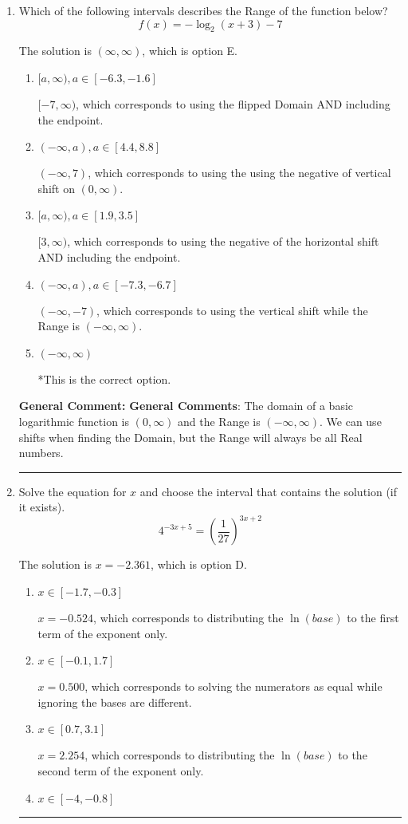 \documentclass{extbook}[14pt]
\newcommand{\litem}[1]{\item #1

\rule{\textwidth}{0.4pt}}
\begin{document}
\begin{enumerate}\litem{
Which of the following intervals describes the Range of the function below?
\[ f(x) = -\log_2{(x+3)}-7 \]

The solution is \( (\infty, \infty) \), which is option E.\begin{enumerate}[label=\Alph*.]
\item \( [a, \infty), a \in [-6.3, -1.6] \)

$[-7, \infty)$, which corresponds to using the flipped Domain AND including the endpoint.
\item \( (-\infty, a), a \in [4.4, 8.8] \)

$(-\infty, 7)$, which corresponds to using the using the negative of vertical shift on $(0, \infty)$.
\item \( [a, \infty), a \in [1.9, 3.5] \)

$[3, \infty)$, which corresponds to using the negative of the horizontal shift AND including the endpoint.
\item \( (-\infty, a), a \in [-7.3, -6.7] \)

$(-\infty, -7)$, which corresponds to using the vertical shift while the Range is $(-\infty, \infty)$.
\item \( (-\infty, \infty) \)

*This is the correct option.
\end{enumerate}

\textbf{General Comment:} \textbf{General Comments}: The domain of a basic logarithmic function is $(0, \infty)$ and the Range is $(-\infty, \infty)$. We can use shifts when finding the Domain, but the Range will always be all Real numbers.
}
\litem{
Solve the equation for $x$ and choose the interval that contains the solution (if it exists).
\[ 4^{-3x+5} = \left(\frac{1}{27}\right)^{3x+2} \]

The solution is \( x = -2.361 \), which is option D.\begin{enumerate}[label=\Alph*.]
\item \( x \in [-1.7, -0.3] \)

$x = -0.524$, which corresponds to distributing the $\ln(base)$ to the first term of the exponent only.
\item \( x \in [-0.1, 1.7] \)

$x = 0.500$, which corresponds to solving the numerators as equal while ignoring the bases are different.
\item \( x \in [0.7, 3.1] \)

$x = 2.254$, which corresponds to distributing the $\ln(base)$ to the second term of the exponent only.
\item \( x \in [-4, -0.8] \)


\end{enumerate}}
\end{enumerate}
\end{document}
